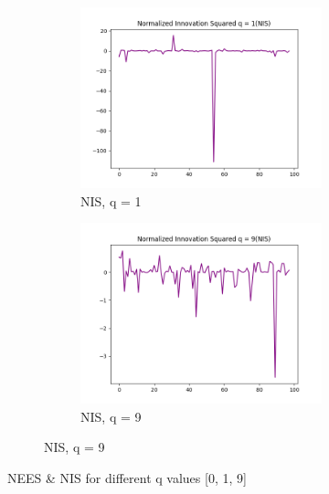 \documentclass{article}
\begin{document}
\begin{figure}[H]
\begin{subfigure} {1\textwidth}
\begin{subfigure}{.3\textwidth}
                    \includegraphics[width=1\linewidth]{./img/nis_1.png}
                    \caption{NIS, q = 1 }
                \end{subfigure}
                \begin{subfigure}{.3\textwidth}
                    \includegraphics[width=1\linewidth]{./img/nis_9.png}
                    \caption{NIS, q = 9 }
                \end{subfigure}
            \end{subfigure} 
            \caption{NEES \& NIS for different q values [0, 1, 9]}
            \label{fig:error1}
        \end{figure}
        
\end{document}
